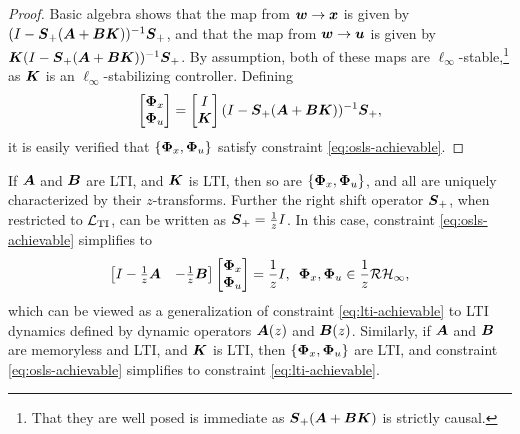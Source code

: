 \begin{proof}
Basic algebra shows that the map from $\boldsymbol{w} \to \boldsymbol{x}$ is given by $(I-\boldsymbol{S}_+(\boldsymbol{A}+\boldsymbol{B}\boldsymbol{K}))^{-1}\boldsymbol{S}_+$, and that the map from $\boldsymbol{w} \to \boldsymbol{u}$ is given by $\boldsymbol{K}(I-\boldsymbol{S}_+(\boldsymbol{A}+\boldsymbol{B}\boldsymbol{K}))^{-1}\boldsymbol{S}_+$.  By assumption, both of these maps are $\ell_\infty$-stable,\footnote{That they are well posed is immediate as $\boldsymbol{S}_+(\boldsymbol{A}+\boldsymbol{B}\boldsymbol{K})$ is strictly causal.} as $\boldsymbol{K}$ is an $\ell_\infty$-stabilizing controller.
Defining
\[
\begin{bmatrix}
\boldsymbol{\Phi}_x \\ \boldsymbol{\Phi}_u
\end{bmatrix} =
\begin{bmatrix} I \\ \boldsymbol{K} \end{bmatrix}(I-\boldsymbol{S}_+(\boldsymbol{A}+\boldsymbol{B}\boldsymbol{K}))^{-1}\boldsymbol{S}_+,
\]
it is easily verified that $\left\{\boldsymbol{\Phi}_x,\boldsymbol{\Phi}_u\right\}$ satisfy constraint \eqref{eq:osls-achievable}.
\end{proof}
\begin{remark}
If $\boldsymbol{A}$ and $\boldsymbol{B}$ are LTI, and $\boldsymbol{K}$ is LTI, then so are $\{\boldsymbol{\Phi}_x,\boldsymbol{\Phi}_u\}$, and all are uniquely characterized by their $z$-transforms.  Further the right shift operator $\boldsymbol{S}_+$, when restricted to $\mathcal{L}_{\mathrm{TI}}$, can be written as $\boldsymbol{S}_+=\frac{1}{z}I$.  In this case, constraint \eqref{eq:osls-achievable} simplifies to
\begin{equation}
\begin{bmatrix} I - \frac{1}{z}\boldsymbol{A}& -\frac{1}{z}\boldsymbol{B} \end{bmatrix} \begin{bmatrix} \boldsymbol{\Phi}_x \\ \boldsymbol{\Phi}_u\end{bmatrix} = \frac{1}{z}I, \, \ \boldsymbol{\Phi}_x, \boldsymbol{\Phi}_u \in \frac{1}{z}\mathcal{RH}_\infty,
\end{equation}
which can be viewed as a generalization of constraint \eqref{eq:lti-achievable} to LTI dynamics defined by dynamic operators $\boldsymbol{A}(z)$ and $\boldsymbol{B}(z)$.  Similarly, if $\boldsymbol{A}$ and $\boldsymbol{B}$ are memoryless and LTI, and $\boldsymbol{K}$ is LTI, then $\{\boldsymbol{\Phi}_x,\boldsymbol{\Phi}_u\}$ are LTI, and constraint \eqref{eq:osls-achievable} simplifies to constraint \eqref{eq:lti-achievable}.
\end{remark}

